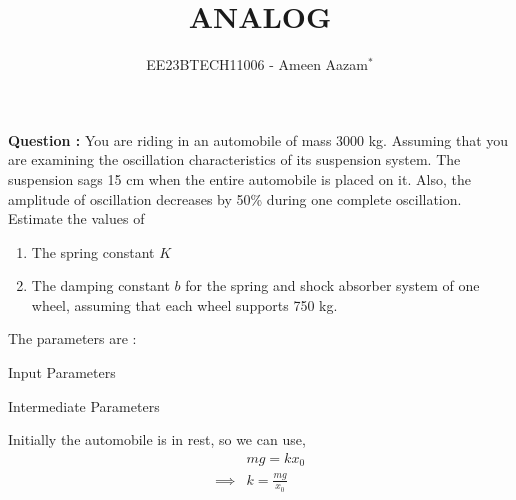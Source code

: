 \documentclass[journal,12pt,twocolumn]{IEEEtran}
\theoremstyle{remark}
\begin{document}

\vspace{3cm}

\title{ANALOG}
\author{EE23BTECH11006 - Ameen Aazam$^{*}$%
}
\maketitle
\newpage
\bigskip

\renewcommand{\thefigure}{\theenumi}
\renewcommand{\thetable}{\theenumi}

\vspace{3cm}
\textbf{Question :}
You are riding in an automobile of mass 3000 kg. Assuming that you are examining the oscillation characteristics of its suspension system. The suspension sags 15 cm when the entire automobile is placed on it. Also, the amplitude of oscillation decreases by 50\% during one complete oscillation. Estimate the values of
\begin{enumerate}[label=(\alph*)]
    \item The spring constant \( K \)
    \item The damping constant \( b \) for the spring and shock absorber system of one wheel, assuming that each wheel supports 750 kg.
\end{enumerate}
\solution
\fi
The parameters are :
    \begin{table}[htbp]
        \centering
        
        \vspace{5pt}
        \caption{Input Parameters}
        \label{tab:Table 1}
    \end{table}
    \begin{table}[htbp]
        \centering
	
        \vspace{5pt}
        \caption{Intermediate Parameters}
        \label{tab:Table 2}
    \end{table}
    
    \vspace{15pt}
    


    Initially the automobile is in rest, so we can use,
    \begin{align}
        &mg = kx_0 \label{eq:1}\\
        \implies &k=\frac{mg}{x_0} \label{eq:2}
    \end{align}
\end{document}

